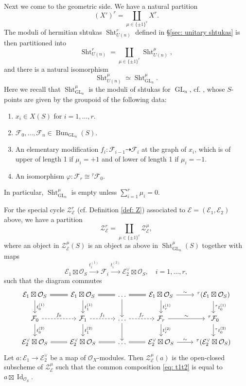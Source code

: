 \documentclass[reqno]{amsart}
\numberwithin{equation}{section}
\newcommand\mnote[1]{\marginpar{\tiny #1}}
\newcommand{\ul}[1]{\underline{#1}}
\newcommand{\Cal}[1]{\mathcal{#1}}
\newcommand{\ft}{{}^{\tau}}
\newcommand{\co}{\colon}
\DeclareMathOperator{\GL}{GL}
\DeclareMathOperator{\Hom}{Hom}
\DeclareMathOperator{\Bun}{Bun}
\DeclareMathOperator{\Id}{Id}
\DeclareMathOperator{\Sht}{Sht}
\newcommand\cE{\mathcal{E}}
\newcommand\cF{\mathcal{F}}
\newcommand\cO{\mathcal{O}}
\newcommand\cZ{\mathcal{Z}}
\theoremstyle{remark}
\numberwithin{equation}{section}
\begin{document}
Next we come to the geometric side. We have a natural partition
$$
(X')^r=\coprod_{\mu\in \{\pm 1\}^r} X^r.
$$
The moduli of hermitian shtukas $\Sht_{U(n)}^r$ defined in \S\ref{sec: unitary shtukas} is then partitioned into 
$$
\Sht_{U(n)}^r=\coprod_{\mu\in \{\pm 1\}^r} \Sht_{U(n)}^{\mu},
$$
and there is a natural isomorphism
$$
 \Sht_{U(n)}^{\mu}\simeq \Sht_{\GL_n}^{\mu}.
$$
Here we recall that $ \Sht_{\GL_n}^{\mu}$ is the moduli of shtukas for $\GL_{n}$, cf. \cite{YZ}, whose
$S$-points are given by the groupoid of the following data: 
\begin{enumerate}
\item $x_i \in X(S)$ for $i = 1, \ldots, r$.
\item  $\Cal{F}_0, \ldots, \Cal{F}_n\in \Bun_{\GL_n} ( S)$.
\item  An elementary modification $f_i \co \Cal{F}_{i-1} \dashrightarrow
 \Cal{F}_i$ at the graph of $x_i$, which is of upper of length 1 if $\mu_i=+1$ and of lower of length 1 if $\mu_i=-1$.%

\item An isomorphism $\varphi \co \Cal{F}_r \cong \ft \Cal{F}_0$. 
\end{enumerate}
In particular, $\Sht_{\GL_n}^{\mu}$ is empty unless $\sum_{i=1}^r \mu_i=0$.


For the special cycle $\cZ_\cE^r $ (cf. Definition \ref{def: Z}) associated to $\cE=(\cE_1,\cE_2)$ above, we have a partition
$$
\cZ_\cE^r =\coprod_{\mu\in \{\pm 1\}^r} \cZ^\mu_\cE,
$$
where an object in $\cZ^\mu_\cE(S)$ is an object as above in $ \Sht_{\GL_n}^{\mu}(S)$ together with maps
\begin{equation}\label{eq: t1t2}
\Cal{E} _1\boxtimes \cO_S \xrightarrow{t_i^{(1)}} \Cal{F}_i  \xrightarrow{t_i^{(2)}}  \Cal{E}_2^{\vee} \boxtimes \cO_S,\quad i = 1, \ldots, r,
\end{equation}
 such that the diagram commutes
\[
\begin{tikzcd}
\Cal{E}_1 \boxtimes \cO_S \ar[d, "t_0^{(1)}"] \ar[r, equals] &  \Cal{E}_1 \boxtimes \cO_S \ar[r, equals]  \ar[d, "t_1^{(1)}"]& \ldots \ar[d] \ar[r, equals] & \Cal{E}_1\boxtimes \cO_S  \ar[r, "\sim"] \ar[d, "t_{r}^{(1)}"] & \ft (\Cal{E}_1 \boxtimes \cO_S) \ar[d, "\ft t_0^{(1)}"] \\
\Cal{F}_0  \ar[d, "t_0^{(2)}"] \ar[r, dashed, "f_0"] & \Cal{F}_1 \ar[r, dashed, "f_1"]   \ar[d, "t_1^{(2)}"]&  \ldots \ar[d] \ar[r, dashed, "f_r"] &  \Cal{F}_{r}\ar[d, "t_{r}^{(2)}"]  \ar[r, "\sim"] & \ft \Cal{F}_0  \ar[d, "\ft t_{0}^{(2)}"]\\
\Cal{E}_2^\vee \boxtimes \cO_S \ar[r, equals] &  \Cal{E}_2^\vee  \boxtimes \cO_S \ar[r, equals] & \ldots  \ar[r, equals] & \Cal{E}_2^\vee  \boxtimes \cO_S\ar[r, "\sim"] & \ft ( \Cal{E}_2^\vee \boxtimes \cO_S)
\end{tikzcd}
\]
Let $a:\cE_1\to\cE_2^\vee$ be a map of $\cO_X$-modules.  Then $\cZ^\mu_\cE(a)$ is the open-closed subscheme of $\cZ^\mu_\cE$ such that the common composition \eqref{eq: t1t2} is equal to $a \boxtimes \Id_{\cO_S} $.
\end{document}
